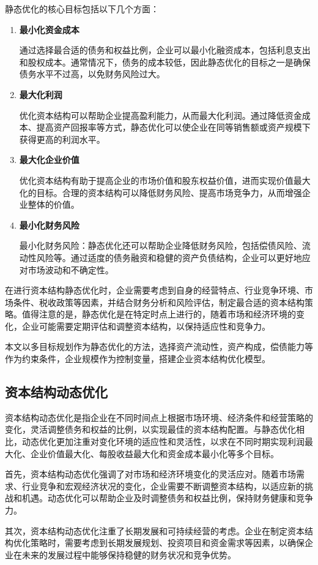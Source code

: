 静态优化的核心目标包括以下几个方面：
\begin{enumerate}[label=(\arabic*)]
\item \textbf{最小化资金成本}

通过选择最合适的债务和权益比例，企业可以最小化融资成本，包括利息支出和股权成本。通常情况下，债务的成本较低，因此静态优化的目标之一是确保债务水平不过高，以免财务风险过大。
\item \textbf{最大化利润}

优化资本结构可以帮助企业提高盈利能力，从而最大化利润。通过降低资金成本、提高资产回报率等方式，静态优化可以使企业在同等销售额或资产规模下获得更高的利润水平。
\item \textbf{最大化企业价值}

优化资本结构有助于提高企业的市场价值和股东权益价值，进而实现价值最大化的目标。合理的资本结构可以降低财务风险、提高市场竞争力，从而增强企业整体的价值。
\item \textbf{最小化财务风险}

最小化财务风险：静态优化还可以帮助企业降低财务风险，包括偿债风险、流动性风险等。通过适度的债务融资和稳健的资产负债结构，企业可以更好地应对市场波动和不确定性。
\end{enumerate}
在进行资本结构静态优化时，企业需要考虑到自身的经营特点、行业竞争环境、市场条件、税收政策等因素，并结合财务分析和风险评估，制定最合适的资本结构策略。值得注意的是，静态优化是在特定时点上进行的，随着市场和经济环境的变化，企业可能需要定期评估和调整资本结构，以保持适应性和竞争力。

本文以多目标规划作为静态优化的方法，选择资产流动性，资产构成，偿债能力等作为约束条件，企业规模作为控制变量，搭建企业资本结构优化模型。 

\subsection{资本结构动态优化}
资本结构动态优化是指企业在不同时间点上根据市场环境、经济条件和经营策略的变化，灵活调整债务和权益的比例，以实现最佳的资本结构配置。与静态优化相比，动态优化更加注重对变化环境的适应性和灵活性，以求在不同时期实现利润最大化、企业价值最大化、每股收益最大化和资金成本最小化等多个目标。

首先，资本结构动态优化强调了对市场和经济环境变化的灵活应对。随着市场需求、行业竞争和宏观经济状况的变化，企业需要不断调整资本结构，以适应新的挑战和机遇。动态优化可以帮助企业及时调整债务和权益比例，保持财务健康和竞争力。

其次，资本结构动态优化注重了长期发展和可持续经营的考虑。企业在制定资本结构优化策略时，需要考虑到长期发展规划、投资项目和资金需求等因素，以确保企业在未来的发展过程中能够保持稳健的财务状况和竞争优势。

